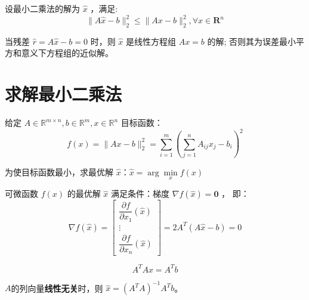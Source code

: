 \begin{theorem}
    设最小二乘法的解为 $ \hat{x} $ ，满足:
    $$
    \|A \hat{x}-b\|_{2}^{2} \leq\|A x-b\|_{2}^{2}, \forall x \in \mathbf{R}^{n}
    $$

    当残差 $ \hat{r}=A \hat{x}-b=0 $ 时，则 $ \hat{x} $ 是线性方程组 $ A x=b $ 的解; 否则其为误差最小平方和意义下方程组的近似解。
\end{theorem}



\section{求解最小二乘法}

给定 $ A \in \mathbb{R}^{m \times n}, b \in \mathbb{R}^{m}, x \in \mathbb{R}^{n} $ 目标函数：
$$
f(x)=\|A x-b\|_{2}^{2}=\sum_{i=1}^{m}\left(\sum_{j=1}^{n} A_{i j} x_{j}-b_{i}\right)^{2}
$$

为使目标函数最小，求最优解 $ \hat{x}：\hat{x}=\arg \underset{x}{\min} f(x) $

\begin{theorem}
    可微函数 $ f(x) $ 的最优解 $ \hat{x} $ 满足条件：梯度 $ \nabla f(\hat{x})=\mathbf{0} $ ， 即：
$$
\nabla f(\hat{x})=\left[\begin{array}{c}
\dfrac{\partial f}{\partial x_{1}}(\hat{x}) \\
\vdots \\
\dfrac{\partial f}{\partial x_{n}}(\hat{x})
\end{array}\right]=2 A^{T}(A \hat{x}-b)=0
$$
\end{theorem}

\begin{theorem}[正规方程与最小二乘解]
    $$ A^{T} A x=A^{T} b $$

    $A$的列向量\textbf{线性无关}时，则 $ \hat{x}=\left(A^{T} A\right)^{-1} A^{T} b $。 
\end{theorem}

